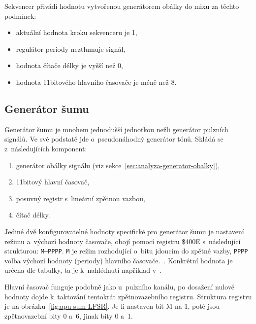 Sekvencer přivádí hodnotu vytvořenou generátorem obálky do mixu za těchto podmínek:
\begin{itemize}
	\item aktuální hodnota kroku sekvenceru je 1,
	\item regulátor periody neztlumuje signál,
	\item hodnota čítače délky je vyšší než 0,
	\item hodnota 11bitového hlavního časovače je méně než 8.
\end{itemize}

\subsection{Generátor šumu}
Generátor šumu je mnohem jednodušší jednotkou nežli generátor pulzních signálů. Ve své podstatě jde o~pseudonáhodný generátor tónů. Skládá se z~následujících komponent:
\begin{enumerate}
	\item generátor obálky signálu (viz sekce~\ref{sec:analyza-generator-obalky}),
	\item 11bitový hlavní časovač,
	\item posuvný registr s~lineární zpětnou vazbou,
	\item čítač délky.
\end{enumerate}

Jediné dvě konfigurovatelné hodnoty specifické pro generátor šumu je nastavení režimu a~výchozí hodnoty časovače, obojí pomocí registru \$400E s~následující strukturou: \texttt{M---PPPP}. \texttt{M} je režim rozhodující o~bitu jdoucím do zpětné vazby, \texttt{PPPP} volba výchozí hodnoty (periody) hlavního časovače.~\cite{Nesdev:apu-noise}. Konkrétní hodnota je určena dle tabulky, ta je k~nahlédnutí například v~\cite{Nesdev:apu-noise}.

Hlavní časovač funguje podobně jako u~pulzního kanálu, po dosažení nulové hodnoty dojde k~taktování tentokrát zpětnovazebního registru. Struktura registru je na obrázku~\ref{fig:apu-sum-LFSR}. Je-li nastaven bit M na 1, poté jsou zpětnovazební bity 0 a~6, jinak bity 0 a~1.~\cite{Nesdev:apu-noise}

